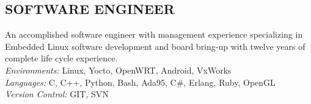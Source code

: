 \documentclass[line]{res}
\begin{document}
\address{San Mateo, CA}
\address{mathew.prokos@gmail.com}

\begin{resume}
\section{SOFTWARE ENGINEER}
    \vspace{1mm}
    An accomplished software engineer with management experience specializing in Embedded Linux software
development and board bring-up with twelve years of complete life cycle experience.\\

    \vspace{-5mm}
    {\sl Environments:} Linux, Yocto, OpenWRT, Android, VxWorks\\
    {\sl Languages:} C, C++, Python, Bash, Ada95, C\#, Erlang, Ruby, OpenGL\\
    {\sl Version Control:} GIT, SVN\\
\vspace{-5mm}

\end{resume}
\end{document}
